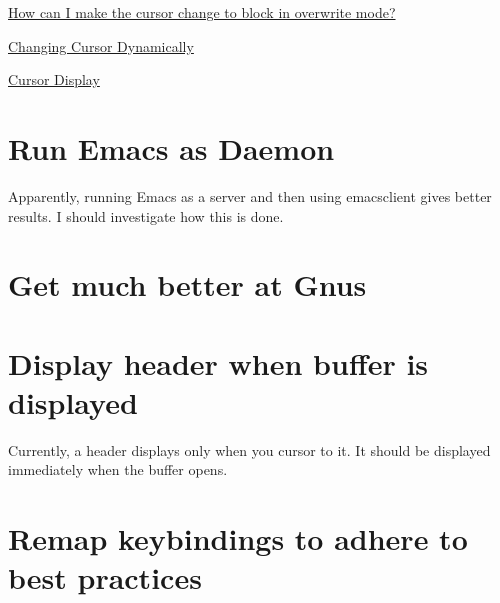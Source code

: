\documentclass{default}
\begin{document}
\href{https://emacs.stackexchange.com/questions/44650/how-can-i-make-the-cursor-change-to-block-in-overwrite-mode?rq=1}{How
  can I make the cursor change to block in overwrite mode?}

\href{https://www.emacswiki.org/emacs/ChangingCursorDynamically}{Changing Cursor Dynamically}

\href{https://www.gnu.org/software/emacs/manual/html_node/emacs/Cursor-Display.html}{Cursor Display}


\section{Run Emacs as Daemon}

Apparently, running Emacs as a server and then using emacsclient gives better results. I should
investigate how this is done.


\section{Get much better at Gnus}



\section{Display header when buffer is displayed}

Currently, a header displays only when you cursor to it. It should be displayed immediately when the
buffer opens.


\section{Remap keybindings to adhere to best practices}
\end{document}
